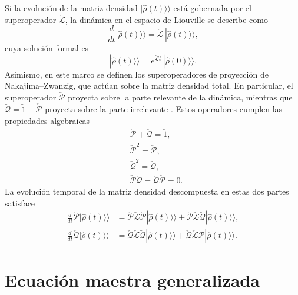 Si la evolución de la matriz densidad $|\hat{\rho}(t)\rangle \rangle$ está gobernada por el superoperador $\check{\mathcal{L}}$, la dinámica en el espacio de Liouville se describe como
\begin{equation*}
    \frac{d}{dt}|\hat{\rho}(t) \rangle \rangle = \check{\mathcal{L}}\,|\hat{\rho}(t) \rangle \rangle,
\end{equation*}
cuya solución formal es
\begin{equation}
    |\hat{\rho}(t)\rangle \rangle = e^{\check{\mathcal{L}}t}\,|\hat{\rho}(0)\rangle \rangle. 
    \label{sec2liouvilleformal}
\end{equation}
Asimismo, en este marco se definen los superoperadores de proyección de Nakajima–Zwanzig, que actúan sobre la matriz densidad total. En particular, el superoperador $\check{\mathcal{P}}$ proyecta sobre la parte relevante de la dinámica, mientras que $\check{\mathcal{Q}} = \check{1} - \check{\mathcal{P}}$ proyecta sobre la parte irrelevante \cite{zwanzig1966statistical}. Estos operadores cumplen las propiedades algebraicas
\begin{align*}
    & \check{\mathcal{P}} + \check{\mathcal{Q}} = \check{1}, \\
    & \check{\mathcal{P}}^{2} = \check{\mathcal{P}}, \\
    & \check{\mathcal{Q}}^{2} = \check{\mathcal{Q}}, \\
    & \check{\mathcal{P}}\check{\mathcal{Q}} = \check{\mathcal{Q}}\check{\mathcal{P}} = 0.
\end{align*}
La evolución temporal de la matriz densidad descompuesta en estas dos partes satisface
\begin{align*}
    \frac{d}{dt}\check{\mathcal{P}}|\hat{\rho}(t)\rangle \rangle 
    &= \check{\mathcal{P}}\check{\mathcal{L}}\check{\mathcal{P}}|\hat{\rho}(t)\rangle \rangle  
     + \check{\mathcal{P}}\check{\mathcal{L}}\check{\mathcal{Q}}|\hat{\rho}(t)\rangle \rangle, \\
    \frac{d}{dt}\check{\mathcal{Q}}|\hat{\rho}(t)\rangle \rangle  
    &= \check{\mathcal{Q}}\check{\mathcal{L}}\check{\mathcal{Q}}|\hat{\rho}(t)\rangle \rangle  
     + \check{\mathcal{Q}}\check{\mathcal{L}}\check{\mathcal{P}}|\hat{\rho}(t)\rangle \rangle.
\end{align*}


\label{sec2:superop}


\section{Ecuación maestra generalizada}

